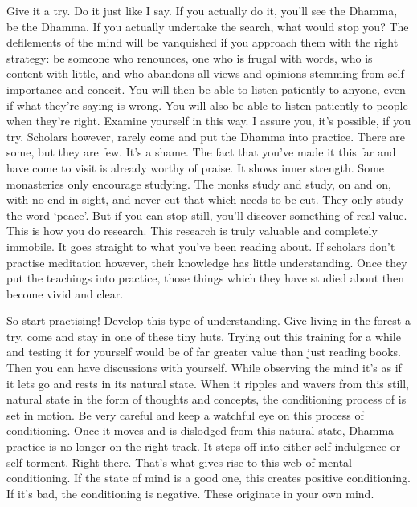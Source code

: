 Give it a try. Do it just like I say. If you actually do it, you'll see the Dhamma, be the Dhamma. If you actually undertake the search, what would stop you? The defilements of the mind will be vanquished if you approach them with the right strategy: be someone who renounces, one who is frugal with words, who is content with little, and who abandons all views and opinions stemming from self-importance and conceit. You will then be able to listen patiently to anyone, even if what they're saying is wrong. You will also be able to listen patiently to people when they're right. Examine yourself in this way. I assure you, it's possible, if you try. Scholars however, rarely come and put the Dhamma into practice. There are some, but they are few. It's a shame. The fact that you've made it this far and have come to visit is already worthy of praise. It shows inner strength. Some monasteries only encourage studying. The monks study and study, on and on, with no end in sight, and never cut that which needs to be cut. They only study the word `peace'. But if you can stop still, you'll discover something of real value. This is how you do research. This research is truly valuable and completely immobile. It goes straight to what you've been reading about. If scholars don't practise meditation however, their knowledge has little understanding. Once they put the teachings into practice, those things which they have studied about then become vivid and clear.

So start practising! Develop this type of understanding. Give living in the forest a try, come and stay in one of these tiny huts. Trying out this training for a while and testing it for yourself would be of far greater value than just reading books. Then you can have discussions with yourself. While observing the mind it's as if it lets go and rests in its natural state. When it ripples and wavers from this still, natural state in the form of thoughts and concepts, the conditioning process of  is set in motion. Be very careful and keep a watchful eye on this process of conditioning. Once it moves and is dislodged from this natural state, Dhamma practice is no longer on the right track. It steps off into either self-indulgence or self-torment. Right there. That's what gives rise to this web of mental conditioning. If the state of mind is a good one, this creates positive conditioning. If it's bad, the conditioning is negative. These originate in your own mind.

